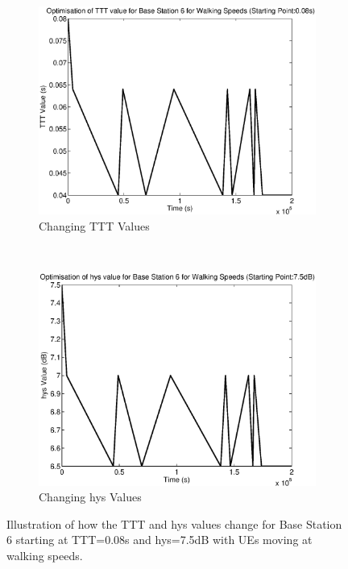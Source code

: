 \begin{figure}[H]
        \centering
        \begin{subfigure}[b]{0.49\textwidth}
                \includegraphics[width=\textwidth]{figures/graphs/walkhighhys/TTT6.eps}
                \caption{Changing TTT Values}
        \end{subfigure}%
        ~ %
        \begin{subfigure}[b]{0.49\textwidth}
                \includegraphics[width=\textwidth]{figures/graphs/walkhighhys/hys6.eps}
                \caption{Changing hys Values}
        \end{subfigure}
        \caption{Illustration of how the TTT and hys values change for Base Station 6 starting at TTT=0.08s and hys=7.5dB with UEs moving at walking speeds.}
\end{figure}
